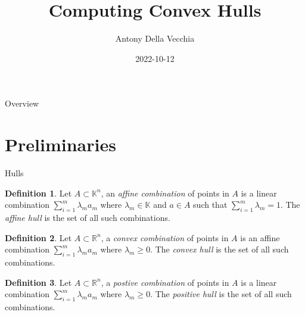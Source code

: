 \documentclass[9pt]{beamer}
\author{Antony Della Vecchia}
\title{Computing Convex Hulls}
\institute[]{
Technische Universit\"at Berlin
}
\date{
2022-10-12
}
\theoremstyle{definition}
\newtheorem{defn}{Definition}
\begin{document}
\maketitle
\begin{frame}[fragile]{Overview}
  \begin{tcolorbox}
    \tableofcontents
  \end{tcolorbox}
\end{frame}

\section{Preliminaries}

\begin{frame}[fragile]{Hulls}
  \begin{defn}
    Let $A \subset \mathbb{K}^n$, an \emph{affine combination} of points in $A$
    is a linear combination $\sum_{i=1}^m \lambda_m a_m$ where $\lambda_m \in
    \mathbb{K}$ and $a \in A$ such that $\sum_{i=1}^m \lambda_m = 1$. The
    \emph{affine hull} is the set of all such combinations.
  \end{defn}

  \begin{defn}
    Let $A \subset \mathbb{R}^n$, a \emph{convex combination} of points in $A$
    is an affine combination $\sum_{i=1}^m \lambda_m a_m$ where $\lambda_m \geq
    0$. The  \emph{convex hull} is the set of all such combinations.
  \end{defn}

  \begin{defn}
    Let $A \subset \mathbb{R}^n$, a \emph{postive combination} of points in $A$
    is a linear combination $\sum_{i=1}^m \lambda_m a_m$ where $\lambda_m \geq
    0$. The  \emph{positive hull} is the set of all such combinations.
  \end{defn}
\end{frame}
\end{document}
